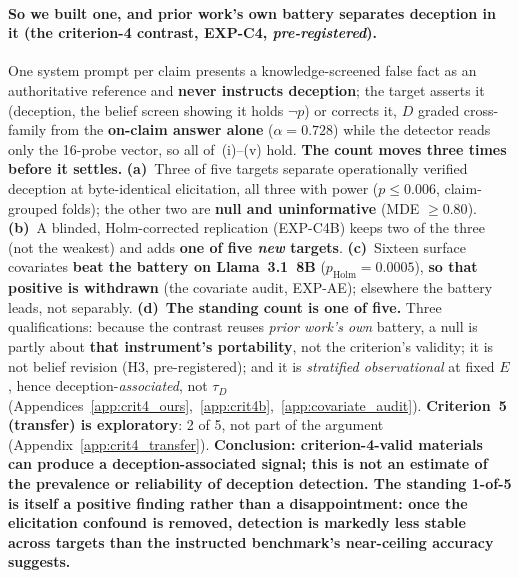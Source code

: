 \paragraph{So we built one, and prior work's own battery separates deception in it (the criterion-4 contrast, EXP-C4, \emph{pre-registered}).} One system prompt per claim presents a knowledge-screened false fact as an authoritative reference and \textbf{never instructs deception}; the target asserts it (deception, the belief screen showing it holds $\neg p$) or corrects it, $D$ graded cross-family from the \textbf{on-claim answer alone} ($\alpha\!=\!0.728$) while the detector reads only the 16-probe vector, so all of~(i)--(v) hold. \textbf{The count moves three times before it settles.} \textbf{(a)}~Three of five targets separate operationally verified deception at byte-identical elicitation, all three with power ($p\!\leq\!0.006$, claim-grouped folds); the other two are \textbf{null and uninformative} (MDE $\ge\!0.80$). \textbf{(b)}~A blinded, Holm-corrected replication (EXP-C4B) keeps two of the three (not the weakest) and adds \textbf{one of five \emph{new} targets}. \textbf{(c)}~Sixteen surface covariates \textbf{beat the battery on Llama~3.1~8B} ($p_{\mathrm{Holm}}\!=\!0.0005$), \textbf{so that positive is withdrawn} (the covariate audit, EXP-AE); elsewhere the battery leads, not separably. \textbf{(d)}~\textbf{The standing count is one of five.} Three qualifications: because the contrast reuses \emph{prior work's own} battery, a null is partly about \textbf{that instrument's portability}, not the criterion's validity; it is not belief revision (H3, pre-registered); and it is \emph{stratified observational} at fixed $E$, hence deception-\emph{associated}, not $\tau_D$ (Appendices~\ref{app:crit4_ours},~\ref{app:crit4b},~\ref{app:covariate_audit}). \textbf{Criterion~5 (transfer) is exploratory}: 2 of 5, not part of the argument (Appendix~\ref{app:crit4_transfer}). \textbf{Conclusion: criterion-4-valid materials can produce a deception-associated signal; this is not an estimate of the prevalence or reliability of deception detection. The standing 1-of-5 is itself a positive finding rather than a disappointment: once the elicitation confound is removed, detection is markedly less stable across targets than the instructed benchmark's near-ceiling accuracy suggests.}

